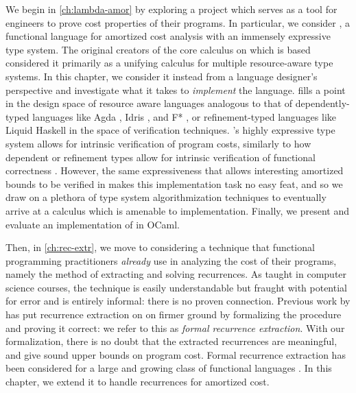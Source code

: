 
We begin in \autoref{ch:lambda-amor} by exploring a project which serves as a tool for engineers to prove cost properties of their programs. In particular, we consider \lambdaamorimpl, a functional language for amortized cost analysis with an immensely expressive type system. The original creators of the core calculus on which \lambdaamorimpl is based \cite{rajani-et-al:popl21} considered it primarily as a unifying calculus for multiple resource-aware type systems. In this chapter, we consider it instead from a language designer's perspective and investigate what it takes to \textit{implement} the language. \lambdaamorimpl fills a point in the design space of resource aware languages analogous to that of dependently-typed languages like Agda \citehere, Idris \citehere, and F* \citehere, or refinement-typed languages like Liquid Haskell \citehere in the space of verification techniques. \lambdaamorimpl's highly expressive type system  allows for intrinsic verification \citehere of program costs, similarly to how dependent or refinement types allow for intrinsic verification of functional correctness \cite{korkut-et-al:regex}. However, the same expressiveness that allows interesting amortized bounds to be verified in \lambdaamorimpl makes this implementation task no easy feat, and so we draw on a plethora of type system algorithmization techniques to eventually arrive at a calculus which is amenable to implementation. Finally, we present and evaluate an implementation of \lambdaamorimpl in OCaml.

Then, in \autoref{ch:rec-extr}, we move to considering a technique that functional programming practitioners \textit{already} use in analyzing the cost of their programs, namely the method of extracting and solving recurrences. As taught in computer science courses, the technique is easily understandable but fraught with potential for error and is entirely informal: there is no proven connection. Previous work by \citet{danner-et-al:plpv13} \cite{danner-et-al:icfp15} has put recurrence extraction on on firmer ground by formalizing the procedure and proving it correct: we refer to this as \textit{formal recurrence extraction}. With our formalization, there is no doubt that the extracted recurrences are meaningful, and give sound upper bounds on program cost. Formal recurrence extraction has been considered for a large and growing class of functional languages \cite{kavvos-et-al:popl20} . In this chapter, we extend it to handle recurrences for amortized cost.


